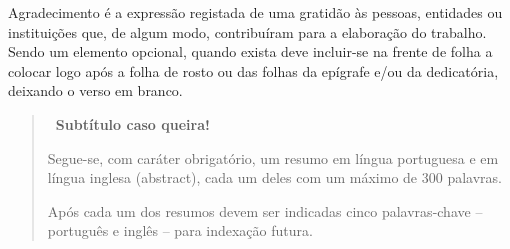 
\begin{acknowledgements}

Agradecimento é a expressão registada de uma gratidão às pessoas, entidades ou instituições que, de algum modo, contribuíram para a elaboração do trabalho. Sendo um elemento opcional, quando exista deve incluir-se na frente de folha a colocar logo após a folha de rosto ou das folhas da epígrafe e/ou da dedicatória, deixando o verso em branco.

\end{acknowledgements}





\begin{abstract}

\noindent \textbf{\ Subtítulo caso queira!}

Segue-se, com caráter obrigatório, um resumo em língua portuguesa e em língua inglesa (abstract), cada um deles com um máximo de 300 palavras.

Após cada um dos resumos devem ser indicadas cinco palavras-chave – português e inglês – para indexação futura.

\end{abstract}


